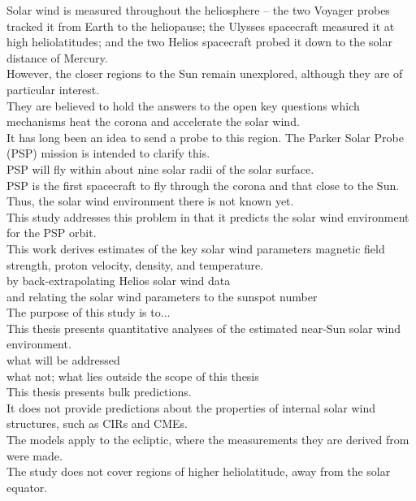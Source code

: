 Solar wind is measured throughout the heliosphere -- the two Voyager probes tracked it from Earth to the heliopause; the Ulysses spacecraft measured it at high heliolatitudes; and the two Helios spacecraft probed it down to the solar distance of Mercury.\\

However, the closer regions to the Sun remain unexplored, although they are of particular interest.\\
They are believed to hold the answers to the open key questions which mechanisms heat the corona and accelerate the solar wind.\\

It has long been an idea to send a probe to this region. The Parker Solar Probe (PSP) mission is intended to clarify this.\\

PSP will fly within about nine solar radii of the solar surface.\\


PSP is the first spacecraft to fly through the corona and that close to the Sun. Thus, the solar wind environment there is not known yet.\\

This study addresses this problem in that it predicts the solar wind environment for the PSP orbit.\\

This work derives estimates of the key solar wind parameters magnetic field strength, proton velocity, density, and temperature.\\

by back-extrapolating Helios solar wind data\\
and relating the solar wind parameters to the sunspot number\\



The purpose of this study is to...\\
This thesis presents quantitative analyses of the estimated near-Sun solar wind environment.\\

what will be addressed\\
what not; what lies outside the scope of this thesis\\
This thesis presents bulk predictions.\\
It does not provide predictions about the properties of internal solar wind structures, such as CIRs and CMEs.\\
The models apply to the ecliptic, where the measurements they are derived from were made.\\
The study does not cover regions of higher heliolatitude, away from the solar equator.\\




